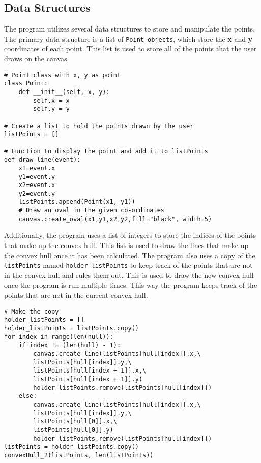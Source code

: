 \documentclass{article}
\begin{document}
\subsection{Data Structures}

The program utilizes several data structures to store and manipulate the points. The primary data structure is a list of \texttt{Point objects}, which store the \textbf{x} and \textbf{y} coordinates of each point. This list is used to store all of the points that the user draws on the canvas.
\newline
\begin{lstlisting}
# Point class with x, y as point
class Point:
    def __init__(self, x, y):
        self.x = x
        self.y = y

# Create a list to hold the points drawn by the user
listPoints = []

# Function to display the point and add it to listPoints
def draw_line(event):
    x1=event.x
    y1=event.y
    x2=event.x
    y2=event.y
    listPoints.append(Point(x1, y1))
    # Draw an oval in the given co-ordinates
    canvas.create_oval(x1,y1,x2,y2,fill="black", width=5)
\end{lstlisting}
Additionally, the program uses a list of integers to store the indices of the points that make up the convex hull. This list is used to draw the lines that make up the convex hull once it has been calculated.
\newline
\newline
The program also uses a copy of the \texttt{listPoints} named \texttt{holder\_listPoints} to keep track of the points that are not in the convex hull and rules them out. This is used to draw the new convex hull once the program is run multiple times. This way the program keeps track of the points that are not in the current convex hull.
\newline
\begin{lstlisting}
# Make the copy
holder_listPoints = []
holder_listPoints = listPoints.copy()
for index in range(len(hull)):
    if index != (len(hull) - 1):
        canvas.create_line(listPoints[hull[index]].x,\
        listPoints[hull[index]].y,\
        listPoints[hull[index + 1]].x,\
        listPoints[hull[index + 1]].y)
        holder_listPoints.remove(listPoints[hull[index]])
    else:
        canvas.create_line(listPoints[hull[index]].x,\
        listPoints[hull[index]].y,\
        listPoints[hull[0]].x,\
        listPoints[hull[0]].y)
        holder_listPoints.remove(listPoints[hull[index]])
listPoints = holder_listPoints.copy()
convexHull_2(listPoints, len(listPoints))

\end{lstlisting}
\end{document}
